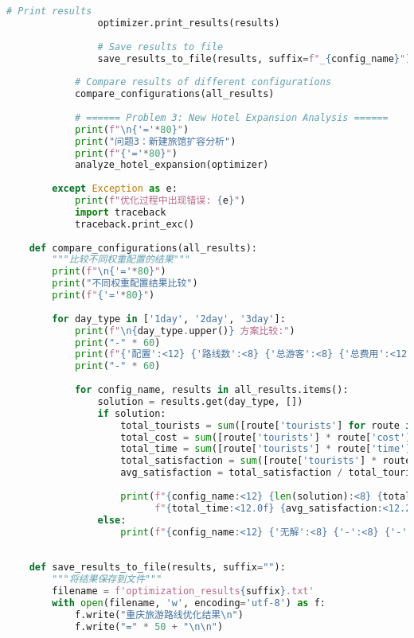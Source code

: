 \begin{lstlisting}[language=Python]
                # Print results
                optimizer.print_results(results)
                
                # Save results to file
                save_results_to_file(results, suffix=f"_{config_name}")
            
            # Compare results of different configurations
            compare_configurations(all_results)
    
            # ====== Problem 3: New Hotel Expansion Analysis ======
            print(f"\n{'='*80}")
            print("问题3：新建旅馆扩容分析")
            print(f"{'='*80}")
            analyze_hotel_expansion(optimizer)
            
        except Exception as e:
            print(f"优化过程中出现错误: {e}")
            import traceback
            traceback.print_exc()
    
    def compare_configurations(all_results):
        """比较不同权重配置的结果"""
        print(f"\n{'='*80}")
        print("不同权重配置结果比较")
        print(f"{'='*80}")
        
        for day_type in ['1day', '2day', '3day']:
            print(f"\n{day_type.upper()} 方案比较:")
            print("-" * 60)
            print(f"{'配置':<12} {'路线数':<8} {'总游客':<8} {'总费用':<12} {'总时间':<12} {'平均满意度':<12}")
            print("-" * 60)
            
            for config_name, results in all_results.items():
                solution = results.get(day_type, [])
                if solution:
                    total_tourists = sum([route['tourists'] for route in solution])
                    total_cost = sum([route['tourists'] * route['cost'] for route in solution])
                    total_time = sum([route['tourists'] * route['time'] for route in solution])
                    total_satisfaction = sum([route['tourists'] * route['satisfaction'] for route in solution])
                    avg_satisfaction = total_satisfaction / total_tourists if total_tourists > 0 else 0
                    
                    print(f"{config_name:<12} {len(solution):<8} {total_tourists:<8} {total_cost:<12.0f} "
                          f"{total_time:<12.0f} {avg_satisfaction:<12.2f}")
                else:
                    print(f"{config_name:<12} {'无解':<8} {'-':<8} {'-':<12} {'-':<12} {'-':<12}")
    
    
    def save_results_to_file(results, suffix=""):
        """将结果保存到文件"""
        filename = f'optimization_results{suffix}.txt'
        with open(filename, 'w', encoding='utf-8') as f:
            f.write("重庆旅游路线优化结果\n")
            f.write("=" * 50 + "\n\n")
            

\end{lstlisting}
